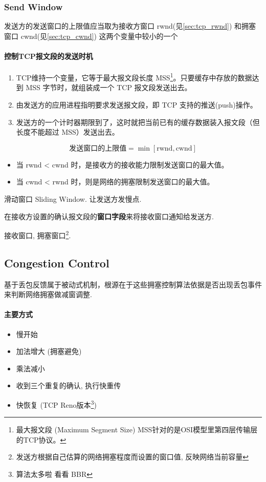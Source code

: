 \documentclass[a4paper]{report}
\begin{document}
\subsubsection{Send Window}
\label{sec:tcp_swnd}
发送方的发送窗口的上限值应当取为接收方窗口 rwnd(见\ref{sec:tcp_rwnd}) 和拥塞窗口 cwnd(见\ref{sec:tcp_cwnd}) 这两个变量中较小的一个

\paragraph{控制TCP报文段的发送时机}
\begin{enumerate}
  \item TCP维持一个变量，它等于最大报文段长度 MSS\footnote{ 最大报文段 (Maximum Segment Size) MSS针对的是OSI模型里第四层传输层的TCP协议。}。只要缓存中存放的数据达到 MSS 字节时，就组装成一个 TCP 报文段发送出去。
  \item 由发送方的应用进程指明要求发送报文段，即 TCP 支持的推送(push)操作。
  \item 发送方的一个计时器期限到了，这时就把当前已有的缓存数据装入报文段（但长度不能超过 MSS）发送出去。
\end{enumerate}

\begin{equation}
  \text{发送窗口的上限值} = \min [\text{rwnd}, \text{cwnd}]
\end{equation}

\begin{itemize}
  \item 当 rwnd < cwnd 时，是接收方的接收能力限制发送窗口的最大值。
  \item 当 cwnd < rwnd 时，则是网络的拥塞限制发送窗口的最大值。 
\end{itemize}
滑动窗口 Sliding Window. 让发送方发慢点. 

在接收方设置的确认报文段的\textbf{窗口字段}来将接收窗口通知给发送方. 

接收窗口, 拥塞窗口\footnote{发送方根据自己估算的网络拥塞程度而设置的窗口值, 反映网络当前容量}. 
\subsection{Congestion Control}
基于丢包反馈属于被动式机制，根源在于这些拥塞控制算法依据是否出现丢包事件来判断网络拥塞做减窗调整. 
\paragraph{主要方式}
\begin{itemize}
  \item 慢开始
  \item 加法增大 (拥塞避免)
  \item 乘法减小
  \item 收到三个重复的确认, 执行快重传
  \item 快恢复 (TCP Reno版本\footnote{算法太多啦 看看 BBR}) 
\end{itemize}
\end{document}
